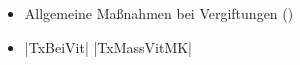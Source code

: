 \label{m:intoxikation-alkohol}
\begin{itemize}
    \item Allgemeine Maßnahmen bei Vergiftungen
    ()
    \item |TxBeiVit| |TxMassVitMK|
\end{itemize}